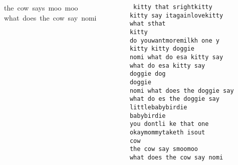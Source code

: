 \begin{frame}
{\begin{columns}[t]
\begin{column}{0.5\textwidth}
{the~cow~says~moo~moo\\
what~does~the~cow~say~nomi\\
}
\end{column}
\begin{column}{0.5\textwidth}
{\tt\small
kitty~that~srightkitty\\
kitty~say~itagainlovekitty\\
what~sthat\\
kitty\\
do~youwantmoremilkh~one~y\\
kitty~kitty~doggie\\
nomi~what~do~esa~kitty~say\\
what~do~esa~kitty~say\\
doggie~dog\\
doggie\\
nomi~what~does~the~doggie~say\\
what~do~es~the~doggie~say\\
littlebabybirdie\\
babybirdie\\
you~dontli~ke~that~one\\
okaymommytaketh~isout\\
cow\\
the~cow~say~smoomoo\\
what~does~the~cow~say~nomi\\
}
\end{column}
\end{columns}
}
\end{frame}




